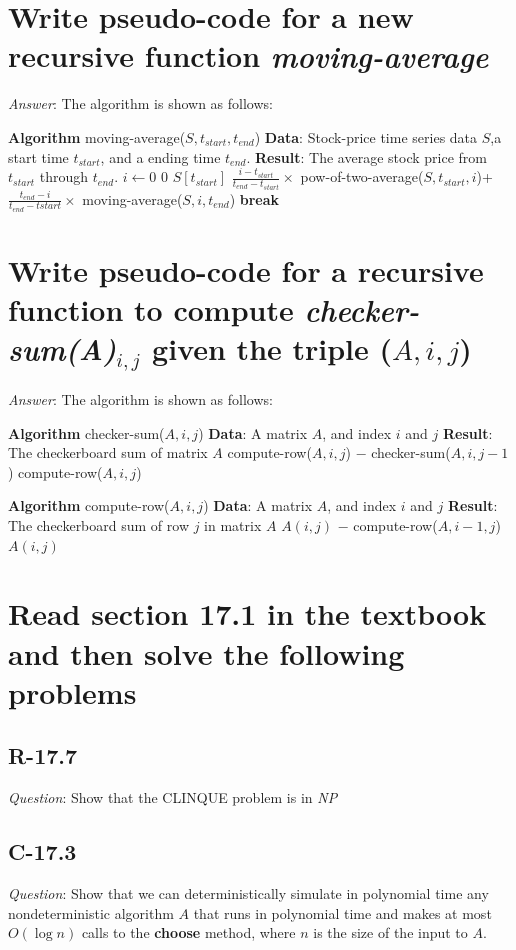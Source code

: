 \documentclass[11pt]{article}
\begin{document}
\section{Write pseudo-code for a new recursive function \emph{moving-average}}
	\emph{Answer}: The algorithm is shown as follows:
	\begin{algorithmic}
	\State \textbf{Algorithm} moving-average($S,t_{start},t_{end}$)
	\State \textbf{Data}: Stock-price time series data $S$,a start time $t_{start}$, and a ending time $t_{end}$.
	\State \textbf{Result}: The average stock price from $t_{start}$ through $t_{end}$.
	\State $i\gets0$
		\State \Return $0$
	\EndIf
		\State \Return ${S[t_{start}]}$
	\EndIf
			\State \Return $\frac{i-t_{start}}{t_{end}-t_{start}}\times$ pow-of-two-average($S,t_{start},i$)+$\frac{t_{end}-i}{t_{end}-t{start}}\times$ moving-average($S,i,t_{end}$)
			\State \textbf{break}
		\EndIf
	\EndFor
	\State {}
	\end{algorithmic}
\section{Write pseudo-code for a recursive function to compute \emph{checker-sum(A)$_{i,j}$} given the triple ($A,i,j$)}
	\emph{Answer}: The algorithm is shown as follows:
	\begin{algorithmic}
	\State \textbf{Algorithm} checker-sum($A,i,j$)
	\State \textbf{Data}: A matrix $A$, and index $i$ and $j$
	\State \textbf{Result}: The checkerboard sum of matrix $A$
	\If {$j>1$}
		\State \Return compute-row($A,i,j$) $-$ checker-sum($A,i,j-1$)
	\Else
		\State \Return compute-row($A,i,j$)
	\EndIf
	\end{algorithmic}

	\begin{algorithmic}
	\State \textbf{Algorithm} compute-row($A,i,j$)
	\State \textbf{Data}: A matrix $A$, and index $i$ and $j$
	\State \textbf{Result}: The checkerboard sum of row $j$ in matrix $A$
	\If {$i>1$}
		\State \Return $A(i,j)$ $-$ compute-row($A,i-1,j$)
	\Else
		\State \Return $A(i,j)$
	\EndIf
	\end{algorithmic}
\section{Read section 17.1 in the textbook and then solve the following problems}
\subsection{R-17.7}
	\emph{Question}: Show that the CLINQUE problem is in \emph{NP}
	
\subsection{C-17.3}
	\emph{Question}: Show that we can deterministically simulate in polynomial time any nondeterministic algorithm $A$ that runs in polynomial time and makes at most $O(\log n)$ calls to the \textbf{choose} method, where $n$ is the size of the input to $A$.
\end{document}
